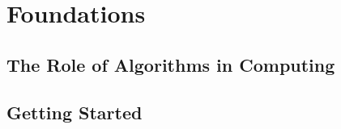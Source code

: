 \documentclass[12pt]{article}
\begin{document}
\section{Foundations}

\subsection*{The Role of Algorithms in Computing}

\subsection*{Getting Started}
\end{document}
